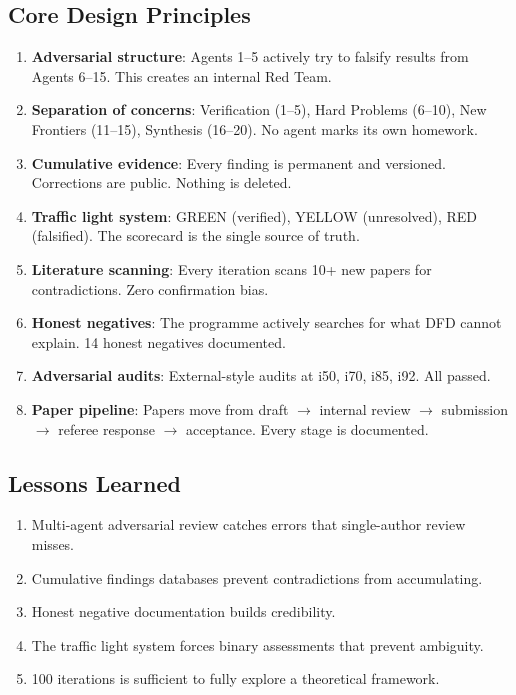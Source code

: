 \documentclass[11pt,a4paper]{article}
\begin{document}
\begin{tcolorbox}[colback=blue!5!white, colframe=dfdblue, title=\textbf{METHODOLOGY DOCUMENT: THE 20-AGENT ARCHITECTURE}]

\subsection*{Core Design Principles}

\begin{enumerate}[nosep]
\item \textbf{Adversarial structure}: Agents 1--5 actively try to falsify results from Agents 6--15. This creates an internal Red Team.

\item \textbf{Separation of concerns}: Verification (1--5), Hard Problems (6--10), New Frontiers (11--15), Synthesis (16--20). No agent marks its own homework.

\item \textbf{Cumulative evidence}: Every finding is permanent and versioned. Corrections are public. Nothing is deleted.

\item \textbf{Traffic light system}: GREEN (verified), YELLOW (unresolved), RED (falsified). The scorecard is the single source of truth.

\item \textbf{Literature scanning}: Every iteration scans 10+ new papers for contradictions. Zero confirmation bias.

\item \textbf{Honest negatives}: The programme actively searches for what DFD cannot explain. 14 honest negatives documented.

\item \textbf{Adversarial audits}: External-style audits at i50, i70, i85, i92. All passed.

\item \textbf{Paper pipeline}: Papers move from draft $\to$ internal review $\to$ submission $\to$ referee response $\to$ acceptance. Every stage is documented.
\end{enumerate}

\subsection*{Lessons Learned}

\begin{enumerate}[nosep]
\item Multi-agent adversarial review catches errors that single-author review misses.
\item Cumulative findings databases prevent contradictions from accumulating.
\item Honest negative documentation builds credibility.
\item The traffic light system forces binary assessments that prevent ambiguity.
\item 100 iterations is sufficient to fully explore a theoretical framework.
\end{enumerate}
\end{tcolorbox}
\end{document}

